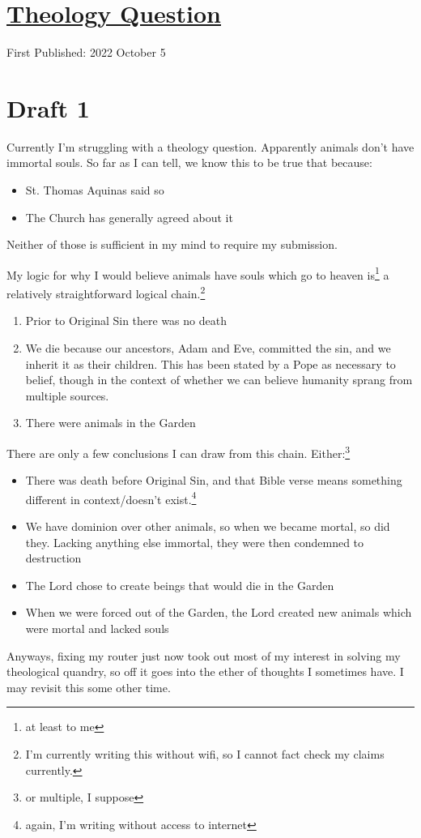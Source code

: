 \documentclass[12pt]{article}[titlepage]
\newcommand{\1}{\={a}}
\newcommand{\2}{\={e}}
\newcommand{\3}{\={\i}}
\newcommand{\4}{\=o}
\newcommand{\5}{\=u}
\newcommand{\6}{\={A}}
\renewcommand{\,}{\textsuperscript{,}}
\begin{document}
\doublespacing
\section{\href{theology-question.html}{Theology Question}}
First Published: 2022 October 5
\section{Draft 1}
Currently I'm struggling with a theology question.
Apparently animals don't have immortal souls.
So far as I can tell, we know this to be true that because:
\begin{itemize}
\item St. Thomas Aquinas said so
\item The Church has generally agreed about it
\end{itemize}

Neither of those is sufficient in my mind to require my submission.

My logic for why I would believe animals have souls which go to heaven is\footnote{at least to me} a relatively straightforward logical chain.\footnote{I'm currently writing this without wifi, so I cannot fact check my claims currently.}

\begin{enumerate}
\item Prior to Original Sin there was no death
\item We die because our ancestors, Adam and Eve, committed the sin, and we inherit it as their children. This has been stated by a Pope as necessary to belief, though in the context of whether we can believe humanity sprang from multiple sources.
\item There were animals in the Garden
\end{enumerate}
There are only a few conclusions I can draw from this chain. 
Either:\footnote{or multiple, I suppose}
\begin{itemize}
\item There was death before Original Sin, and that Bible verse means something different in context/doesn't exist.\footnote{again, I'm writing without access to internet}
\item We have dominion over other animals, so when we became mortal, so did they. Lacking anything else immortal, they were then condemned to destruction
\item The Lord chose to create beings that would die in the Garden
\item When we were forced out of the Garden, the Lord created new animals which were mortal and lacked souls
\end{itemize}
Anyways, fixing my router just now took out most of my interest in solving my theological quandry, so off it goes into the ether of thoughts I sometimes have.
I may revisit this some other time.
\end{document}

